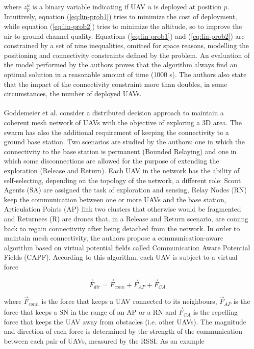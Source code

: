 where $z_p^u$ is a binary variable indicating if \gls{UAV} $u$ is deployed at position $p$. Intuitively, equation (\ref{eq:lin-prob1}) tries to minimize the cost of deployment, while equation (\ref{eq:lin-prob2}) tries to minimize the altitude, so to improve the air-to-ground channel quality. 
Equations (\ref{eq:lin-prob1}) and (\ref{eq:lin-prob2}) are constrained by a set of nine inequalities, omitted for space reasons, modelling the positioning and connectivity constraints defined by the problem. An evaluation of the model performed by the authors proves that the algorithm always find an optimal solution in a reasonable amount of time (1000 s). The authors also state that the impact of the connectivity constraint more than doubles, in some circumstances, the number of deployed \glspl{UAV}. \\ \\
Goddemeier et al. \cite{ref:soa-plac-distr1} consider a distributed decision approach to maintain a coherent mesh network of \glspl{UAV} with the objective of exploring a 3D area. The swarm has also the additional requirement of keeping the connectivity to a ground base station. Two scenarios are studied by the authors: one in which the connectivity to the base station is permanent (Bounded Relaying) and one in which some disconnections are allowed for the purpose of extending the exploration (Release and Return). Each \gls{UAV} in the network has the ability of self-selecting, depending on the topology of the network, a different role: Scout Agents (SA) are assigned the task of exploration and sensing, Relay Nodes (RN) keep the communication between one or more \glspl{UAV} and the base station, Articulation Points (AP) link two clusters that otherwise would be fragmented and Returnees (R) are drones that, in a Release and Return scenario, are coming back to regain connectivity after being detached from the network. In order to maintain mesh connectivity, the authors propose a communication-aware algorithm based on virtual potential fields called Communication Aware Potential Fields (CAPF). According to this algorithm, each \gls{UAV} is subject to a virtual force

\begin{equation}
 \overrightarrow{F}_{dir} = \overrightarrow{F}_{conn} + \overrightarrow{F}_{AP} + \overrightarrow{F}_{CA} 
\end{equation} 

where $\overrightarrow{F}_{conn}$ is the force that keeps a \gls{UAV} connected to its neighbours, $\overrightarrow{F}_{AP}$ is the force that keeps a SN in the range of an AP or a RN and $\overrightarrow{F}_{CA}$ is the repelling force that keeps the \gls{UAV} away from obstacles (i.e. other \glspl{UAV}). The magnitude and direction of each force is determined by the strength of the communication between each pair of \glspl{UAV}, measured by the RSSI. As an example

